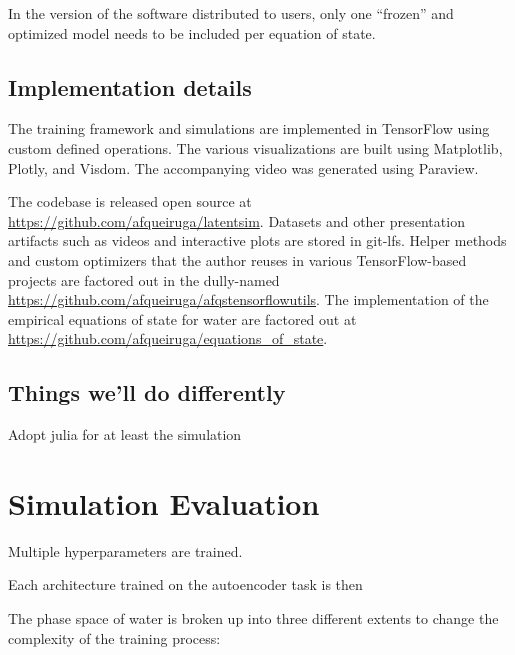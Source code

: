 \documentclass[]{article}
\begin{document}
In the version of the software distributed to users, only one
``frozen'' and optimized model needs to be included per equation of state.

\subsection{Implementation details}

The training framework and simulations are implemented in TensorFlow 
using custom defined operations. The various visualizations are built
using Matplotlib, Plotly, and Visdom. The accompanying video was
generated using Paraview.

The codebase is released open source at
\url{https://github.com/afqueiruga/latentsim}. Datasets and other
presentation artifacts such as videos and interactive plots are stored
in git-lfs. Helper methods and
custom optimizers that the
author reuses in various TensorFlow-based projects are factored out in
the dully-named \url{https://github.com/afqueiruga/afqstensorflowutils}.
The implementation of the empirical equations of state for water are
factored out at
\href{https://github.com/afqueiruga/equations_of_state}{https://github.com/afqueiruga/equations\_of\_state}.

\subsection{Things we'll do differently}

Adopt julia for at least the simulation



\hypertarget{header-n3359}{%
\section{Simulation Evaluation}\label{header-n3359}}

Multiple hyperparameters are trained.

Each architecture trained on the autoencoder task is then

The phase space of water is broken up into three different extents to
change the complexity of the training process:
\end{document}
